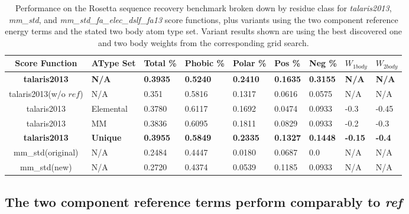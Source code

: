 \begin{table}[!htbp]

\fontsize{9pt}{9pt}
\selectfont

\begin{tabular}{c|llllllll}
Score Function & AType Set & Total \% & Phobic \% & Polar \% & Pos \% & Neg \% & $W_{1body}$ & $W_{2body}$\\
\hline
\textbf{talaris2013} & \textbf{N/A} & \textbf{0.3935} & \textbf{0.5240} & \textbf{0.2410} & \textbf{0.1635} & \textbf{0.3155} & \textbf{N/A} & \textbf{N/A}\\
talaris2013(w/o $ref$) & N/A & 0.351 & 0.5816 & 0.1317 & 0.0616 & 0.0575 & N/A & N/A\\
talaris2013 & Elemental & 0.3780 & 0.6117 & 0.1692 & 0.0474 & 0.0933 & -0.3 & -0.45\\
talaris2013 & MM & 0.3836 & 0.6095 & 0.1811 & 0.0829 & 0.0933 & -0.2 & -0.3\\
\textbf{talaris2013} & \textbf{Unique} & \textbf{0.3955} & \textbf{0.5849} & \textbf{0.2335} & \textbf{0.1327} & \textbf{0.1448} & \textbf{-0.15} & \textbf{-0.4}\\
\hline
mm\_std(original) & N/A & 0.2484 & 0.4447 & 0.0180 & 0.0687 & 0.0 & N/A & N/A\\
mm\_std(new) & N/A & 0.2720 & 0.4374 & 0.0539 & 0.1185 & 0.0933 & N/A & N/A\\

\end{tabular}

\fontsize{10pt}{11pt}
\selectfont
\caption{Performance on the Rosetta sequence recovery benchmark broken down by residue class for \textit{talaris2013}, \textit{mm\_std}, and \textit{mm\_std\_fa\_elec\_dslf\_fa13} score functions, plus variants using the two component reference energy terms and the stated two body atom type set.
Variant results shown are using the best discovered one and two body weights from the corresponding grid search.}
\label{tab:performance}

\end{table}


\subsection{The two component reference terms perform comparably to \textit{ref}}
